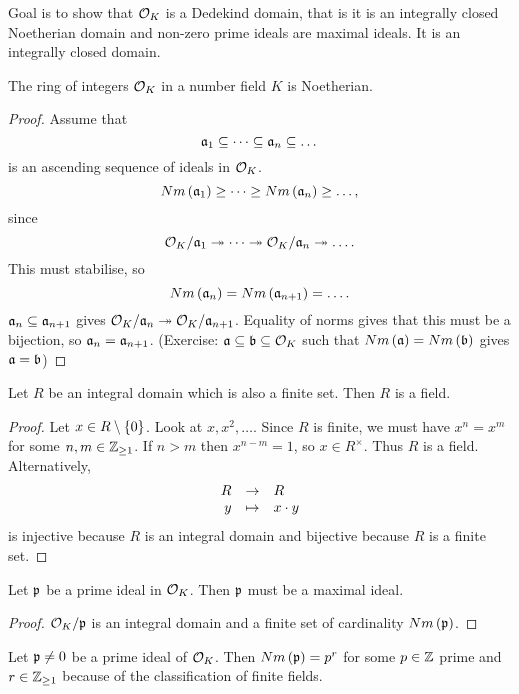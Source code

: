 Goal is to show that $ \OO_K $ is a Dedekind domain, that is it is an integrally closed Noetherian domain and non-zero prime ideals are maximal ideals. It is an integrally closed domain.

\begin{proposition}
The ring of integers $ \OO_K $ in a number field $ K $ is Noetherian.
\end{proposition}

\begin{proof}
Assume that
$$ \aa_1 \subseteq \dots \subseteq \aa_n \subseteq \dots $$
is an ascending sequence of ideals in $ \OO_K $.
$$ Nm\rb{\aa_1} \ge \dots \ge Nm\rb{\aa_n} \ge \dots, $$
since
$$ \OO_K / \aa_1 \twoheadrightarrow \dots \twoheadrightarrow \OO_K / \aa_n \twoheadrightarrow \dots. $$
This must stabilise, so
$$ Nm\rb{\aa_n} = Nm\rb{\aa_{n + 1}} = \dots. $$
$ \aa_n \subseteq \aa_{n + 1} $ gives $ \OO_K / \aa_n \twoheadrightarrow \OO_K / \aa_{n + 1} $. Equality of norms gives that this must be a bijection, so $ \aa_n = \aa_{n + 1} $. (Exercise: $ \aa \subseteq \bb \subseteq \OO_K $ such that $ Nm\rb{\aa} = Nm\rb{\bb} $ gives $ \aa = \bb $)
\end{proof}

\begin{lemma}
Let $ R $ be an integral domain which is also a finite set. Then $ R $ is a field.
\end{lemma}

\begin{proof}
Let $ x \in R \setminus \cb{0} $. Look at $ x, x^2, \dots $. Since $ R $ is finite, we must have $ x^n = x^m $ for some $ n, m \in \Z_{\ge 1} $. If $ n > m $ then $ x^{n - m} = 1 $, so $ x \in R^\times $. Thus $ R $ is a field. Alternatively,
$$ \function{R}{R}{y}{x \cdot y} $$
is injective because $ R $ is an integral domain and bijective because $ R $ is a finite set.
\end{proof}

\begin{lemma}
Let $ \pp $ be a prime ideal in $ \OO_K $. Then $ \pp $ must be a maximal ideal.
\end{lemma}

\begin{proof}
$ \OO_K / \pp $ is an integral domain and a finite set of cardinality $ Nm\rb{\pp} $.
\end{proof}

\begin{remark*}
Let $ \pp \ne 0 $ be a prime ideal of $ \OO_K $. Then $ Nm\rb{\pp} = p^r $ for some $ p \in \Z $ prime and $ r \in \Z_{\ge 1} $ because of the classification of finite fields.
\end{remark*}

